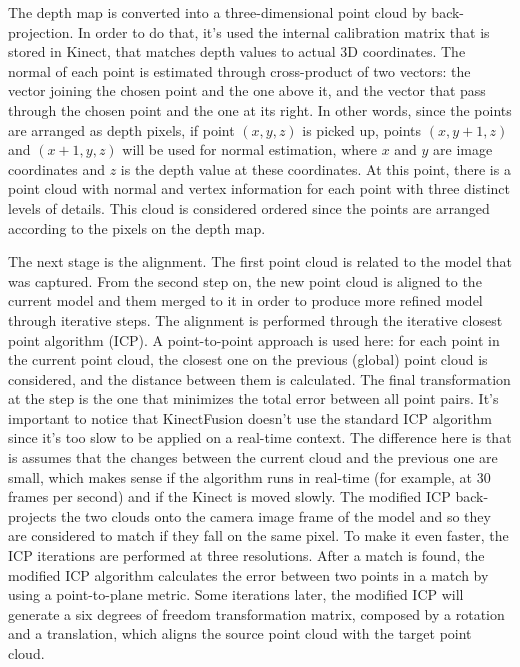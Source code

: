 \documentclass[msc, a4paper, classic, en]{ufbathesis}
\begin{document}
The depth map is converted into a three-dimensional point cloud by back-projection. In order to do that, it's used the internal calibration matrix that is stored in Kinect, that matches depth values to actual 3D coordinates. The normal of each point is estimated through cross-product of two vectors: the vector joining the chosen point and the one above it, and the vector that pass through the chosen point and the one at its right. In other words, since the points are arranged as depth pixels, if point $(x, y, z)$ is picked up, points $(x, y+1, z)$ and $(x+1, y, z)$ will be used for normal estimation, where $x$ and $y$ are image coordinates and $z$ is the depth value at these coordinates. At this point, there is a point cloud with normal and vertex information for each point with three distinct levels of details. This cloud is considered ordered since the points are arranged according to the pixels on the depth map.

The next stage is the alignment. The first point cloud is related to the model that was captured. From the second step on, the new point cloud is aligned to the current model and them merged to it in order to produce more refined model through iterative steps. The alignment is performed through the iterative closest point algorithm (ICP). A point-to-point approach is used here: for each point in the current point cloud, the closest one on the previous (global) point cloud is considered, and the distance between them is calculated. The final transformation at the step is the one that minimizes the total error between all point pairs. It's important to notice that KinectFusion doesn't use the standard ICP algorithm since it's too slow to be applied on a real-time context. The difference here is that is assumes that the changes between the current cloud and the previous one are small, which makes sense if the algorithm runs in real-time (for example, at 30 frames per second) and if the Kinect is moved slowly. The modified ICP back-projects the two clouds onto the camera image frame of the model and so they are considered to match if they fall on the same pixel. To make it even faster, the ICP iterations are performed at three resolutions. After a match is found, the modified ICP algorithm calculates the error between two points in a match by using a point-to-plane metric. Some iterations later, the modified ICP will generate a six degrees of freedom transformation matrix, composed by a rotation and a translation, which aligns the source point cloud with the target point cloud.
\end{document}
